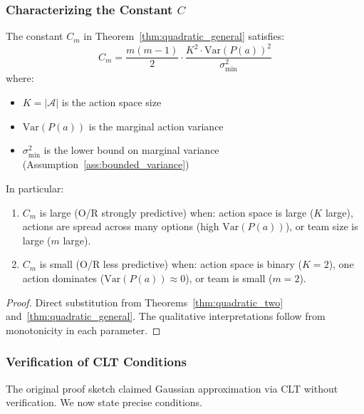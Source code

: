 \subsubsection{Characterizing the Constant $C$}

\begin{proposition}
\label{prop:constant_c}
The constant $C_m$ in Theorem~\ref{thm:quadratic_general} satisfies:
\begin{equation}
C_m = \frac{m(m-1)}{2} \cdot \frac{K^2 \cdot \text{Var}(P(a))^2}{\sigma^2_{\min}}
\end{equation}
where:
\begin{itemize}
    \item $K = |\mathcal{A}|$ is the action space size
    \item $\text{Var}(P(a))$ is the marginal action variance
    \item $\sigma^2_{\min}$ is the lower bound on marginal variance (Assumption~\ref{ass:bounded_variance})
\end{itemize}

In particular:
\begin{enumerate}
    \item $C_m$ is large (O/R strongly predictive) when: action space is large ($K$ large), actions are spread across many options (high $\text{Var}(P(a))$), or team size is large ($m$ large).
    \item $C_m$ is small (O/R less predictive) when: action space is binary ($K = 2$), one action dominates ($\text{Var}(P(a)) \approx 0$), or team is small ($m = 2$).
\end{enumerate}
\end{proposition}

\begin{proof}
Direct substitution from Theorems~\ref{thm:quadratic_two} and~\ref{thm:quadratic_general}. The qualitative interpretations follow from monotonicity in each parameter.
\end{proof}

\subsubsection{Verification of CLT Conditions}

The original proof sketch claimed Gaussian approximation via CLT without verification. We now state precise conditions.

